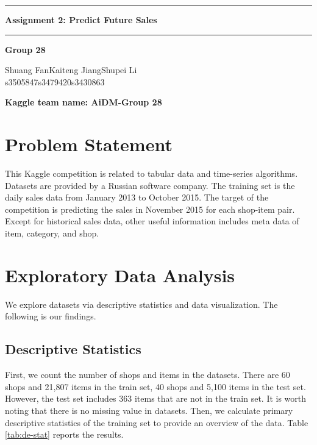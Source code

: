 \documentclass{article}
\begin{document}
\noindent\rule{\textwidth}{1pt}
\begin{center}
    \LARGE \textbf{Assignment 2: Predict Future Sales}
\end{center}
\noindent\rule{\textwidth}{0.5pt}
\begin{center}
    \textbf{Group 28}\par
    \vspace{0.3cm}
Shuang Fan\phantom{space}Kaiteng Jiang\phantom{space}Shupei Li\\
s3505847\phantom{spacespac}s3479420\phantom{spacespa}s3430863
\end{center}
    \vspace{0.2cm}
\textbf{Kaggle team name: AiDM-Group 28}

\section{Problem Statement}
This Kaggle competition is related to tabular data and time-series algorithms. Datasets are provided by a Russian software company. The training set is the daily sales data from January 2013 to October 2015. The target of the competition is predicting the sales in November 2015 for each shop-item pair. Except for historical sales data, other useful information includes meta data of item, category, and shop.

\section{Exploratory Data Analysis}
We explore datasets via descriptive statistics and data visualization. The following is our findings.

\subsection{Descriptive Statistics}\label{stat}
First, we count the number of shops and items in the datasets. There are 60 shops and 21,807 items in the train set, 40 shops and 5,100 items in the test set. However, the test set includes 363 items that are not in the train set. It is worth noting that there is no missing value in datasets. Then, we calculate primary descriptive statistics of the training set to provide an overview of the data. Table \ref{tab:de-stat} reports the results.
\end{document}
